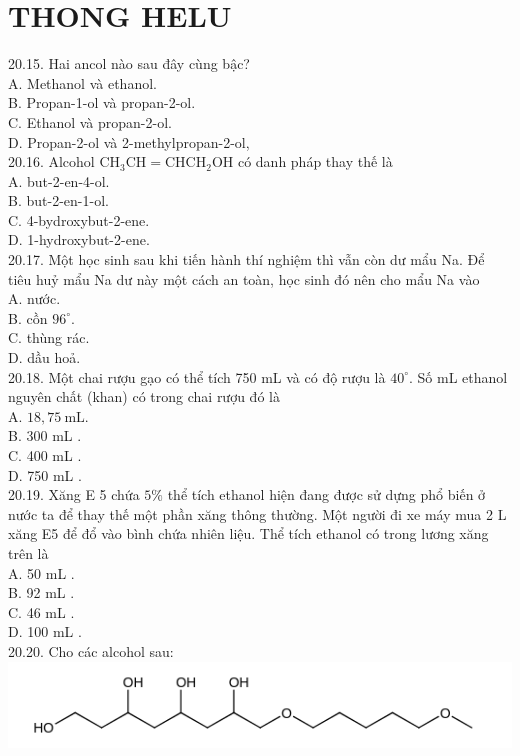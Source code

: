 \documentclass[10pt]{article}
\begin{document}
\section*{THONG HELU}
20.15. Hai ancol nào sau đây cùng bậc?\\
A. Methanol và ethanol.\\
B. Propan-1-ol và propan-2-ol.\\
C. Ethanol và propan-2-ol.\\
D. Propan-2-ol và 2-methylpropan-2-ol,\\
20.16. Alcohol $\mathrm{CH}_{3} \mathrm{CH}=\mathrm{CHCH}_{2} \mathrm{OH}$ có danh pháp thay thế là\\
A. but-2-en-4-ol.\\
B. but-2-en-1-ol.\\
C. 4-bydroxybut-2-ene.\\
D. 1-hydroxybut-2-ene.\\
20.17. Một học sinh sau khi tiến hành thí nghiệm thì vẫn còn dư mẩu Na. Để tiêu huỷ mẩu Na dư này một cách an toàn, học sinh đó nên cho mẩu Na vào\\
A. nước.\\
B. cồn $96^{\circ}$.\\
C. thùng rác.\\
D. dầu hoả.\\
20.18. Một chai rượu gạo có thể tích 750 mL và có độ rượu là $40^{\circ}$. Số mL ethanol nguyên chất (khan) có trong chai rượu đó là\\
A. $18,75 \mathrm{~mL}$.\\
B. 300 mL .\\
C. 400 mL .\\
D. 750 mL .\\
20.19. Xăng E 5 chứa $5 \%$ thể tích ethanol hiện đang được sử dựng phổ biến ở nước ta để thay thế một phần xăng thông thường. Một người đi xe máy mua 2 L xăng E5 để đổ vào bình chứa nhiên liệu. Thể tích ethanol có trong lương xăng trên là\\
A. 50 mL .\\
B. 92 mL .\\
C. 46 mL .\\
D. 100 mL .\\
20.20. Cho các alcohol sau:\\
\includegraphics{smile-05b745ac0f9a73f4cb25e4e2db75e13930d66c15}
\end{document}
